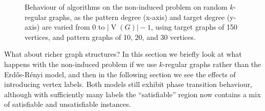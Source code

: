 \documentclass[twoside,11pt]{article}
\begin{document}
\begin{figure}[tb]

    \caption{Behaviour of algorithms on the non-induced problem on random $k$-regular graphs, as the
    pattern degree (x-axis) and target degree (y-axis) are varied from 0 to
    $\left|\operatorname{V}(G)\right| - 1$, using target graphs of 150 vertices, and pattern graphs
    of 10, 20, and 30 vertices.}
    \label{figure:kr}
\end{figure}

What about richer graph structures? In this section we briefly look at what happens with the
non-induced problem if we use $k$-regular graphs rather than the Erd\H{o}s-R\'enyi model, and then
in the following section we see the effects of introducing vertex labels. Both models still exhibit
phase transition behaviour, although with sufficiently many labels the ``satisfiable'' region now
contains a mix of satisfiable and unsatisfiable instances.
\end{document}
